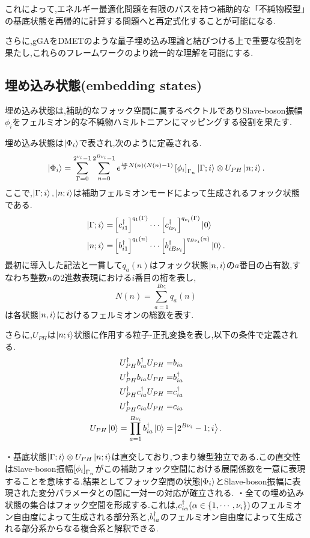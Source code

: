 これによって,エネルギー最適化問題を有限のバスを持つ補助的な「不純物模型」の基底状態を再帰的に計算する問題へと再定式化することが可能になる.

さらに,gGAをDMETのような量子埋め込み理論と結びつける上で重要な役割を果たし,これらのフレームワークのより統一的な理解を可能にする.

\subsection{埋め込み状態(embedding states)}
埋め込み状態は,補助的なフォック空間に属するベクトルでありSlave-boson振幅$\phi_{i}$をフェルミオン的な不純物ハミルトニアンにマッピングする役割を果たす.

埋め込み状態は$\Ket{\Phi_{i}}$で表され,次のように定義される.
\begin{equation}
    \Ket{\Phi_{i}}=\sum_{\Gamma=0}^{2^{\nu_{i}}-1}\sum_{n=0}^{2^{B\nu_{i}}-1}e^{\frac{i\pi}{2}N(n)\left( N(n)-1 \right)}\left[ \phi_{i} \right]_{\Gamma_{n}}\Ket{\Gamma;i}\otimes U_{PH}\Ket{n;i}.
\end{equation}
ここで,$\ket{\Gamma;i},\Ket{n;i}$は補助フェルミオンモードによって生成されるフォック状態である.
\begin{align}
    \Ket{\Gamma;i}=& \left[ c^\dagger_{i1} \right]^{q_{1}\left( \Gamma \right)}\cdots \left[ c^\dagger_{i\nu_{i}} \right]^{q_{\nu_{i}}\left( \Gamma \right)}\Ket{0}\\
    \Ket{n;i}=& \left[ b^\dagger_{i1} \right]^{q_{1}\left( n \right)}\cdots \left[ b^\dagger_{iB\nu_{i}} \right]^{q_{B\nu_{i}}\left( n \right)}\Ket{0}.
\end{align}
最初に導入した記法と一貫して$q_{a}(n)$はフォック状態$\Ket{n,i}$の$a$番目の占有数,すなわち整数$n$の2進数表現における$i$番目の桁を表し,
\begin{equation}
    N(n)=\sum_{a=1}^{B\nu_{i}}q_{a}(n)
\end{equation}
は各状態$\Ket{n,i}$におけるフェルミオンの総数を表す.

さらに,$U_{PH}$は$\Ket{n;i}$状態に作用する粒子-正孔変換を表し,以下の条件で定義される.
\begin{align}
    U^\dagger_{PH}b^\dagger_{ia}U_{PH}=&b_{ia}\\
    U^\dagger_{PH}b_{ia}U_{PH}=&b^\dagger_{ia}\\
    U^\dagger_{PH}c^\dagger_{ia}U_{PH}=&c^\dagger_{ia}\\
    U^\dagger_{PH}c_{ia}U_{PH}=&c_{ia}\\
    U_{PH}\Ket{0}=\prod_{a=1}^{B\nu_{i}}b^\dagger_{ia}\Ket{0}=&\Ket{2^{B\nu_{i}}-1;i}.
\end{align}

・基底状態$\Ket{\Gamma;i}\otimes U_{PH}\ket{n;i}$は直交しており,つまり線型独立である.この直交性はSlave-boson振幅$\left[ \phi_{i} \right]_{\Gamma_{n}}$がこの補助フォック空間における展開係数を一意に表現することを意味する.結果としてフォック空間の状態$\Ket{\Phi_{i}}$とSlave-boson振幅に表現された変分パラメータとの間に一対一の対応が確立される.
・全ての埋め込み状態の集合はフォック空間を形成する.これは,$c^\dagger_{i\alpha}(\alpha\in \left \{ 1,\cdots,\nu_{i} \right\})$のフェルミオン自由度によって生成される部分系と,$b^\dagger_{ia}$のフェルミオン自由度によって生成される部分系からなる複合系と解釈できる.

